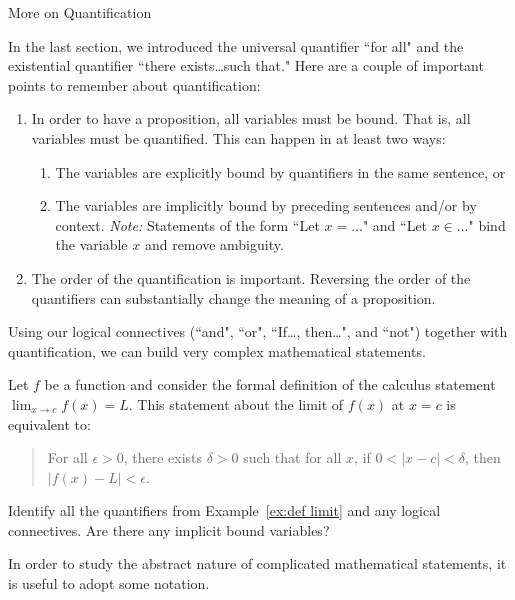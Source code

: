 \begin{section}{More on Quantification}

In the last section, we introduced the universal quantifier ``for all" and the existential quantifier ``there exists\ldots such that."  Here are a couple of important points to remember about quantification:
\begin{enumerate}
\item In order to have a proposition, all variables must be bound.  That is, all variables must be quantified.  This can happen in at least two ways:
\begin{enumerate}
\item The variables are explicitly bound by quantifiers in the same sentence, or
\item The variables are implicitly bound by preceding sentences and/or by context.  \emph{Note:}  Statements of the form ``Let $x=\ldots$" and ``Let $x\in\ldots$" bind the variable $x$ and remove ambiguity.
\end{enumerate}
\item The order of the quantification is important.  Reversing the order of the quantifiers can substantially change the meaning of a proposition.
\end{enumerate}

Using our logical connectives (``and", ``or", ``If\ldots, then\ldots", and ``not") together with quantification, we can build very complex mathematical statements.

\begin{example}\label{ex:def limit}
Let $f$ be a function and consider the formal definition of the calculus statement $\displaystyle\lim_{x\to c}f(x)=L$. This statement about the limit of $f(x)$ at $x=c$ is equivalent to:

\begin{quote}
For all $\epsilon >0$, there exists $\delta >0$ such that for all $x$, if $0<|x-c|<\delta$, then $|f(x)-L|<\epsilon$.
\end{quote}
\end{example}

\begin{exercise}
Identify all the quantifiers from Example~\ref{ex:def limit} and any logical connectives.  Are there any implicit bound variables?
\end{exercise}

In order to study the abstract nature of complicated mathematical statements, it is useful to adopt some notation.


\end{section}
